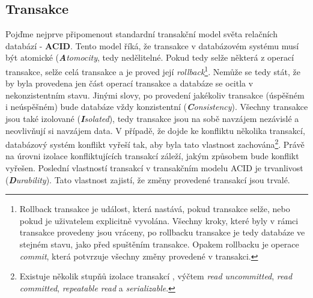 
\subsection{Transakce}
Pojďme nejprve připomenout standardní transakční model světa relačních databází - \textbf{ACID}. Tento model říká, že transakce v databázovém systému musí být atomické (\textit{\textbf{A}tomocity}, tedy nedělitelné. Pokud tedy selže některá z operací transakce, selže celá transakce a je proved její \textit{rollback}\footnote{Rollback transakce je událost, která nastává, pokud transakce selže, nebo pokud je uživatelem explicitně vyvolána. Všechny kroky, které byly v rámci transakce provedeny jsou vráceny, po rollbacku transakce je tedy databáze ve stejném stavu, jako před spuštěním transakce. Opakem rollbacku je operace \textit{commit}, která potvrzuje všechny změny provedené v transakci.}. Nemůže se tedy stát, že by byla provedena jen část operací transakce a databáze se ocitla v nekonzistentním stavu. Jinými slovy, po provedení jakékoliv transakce (úspěšném i neúspěšném) bude databáze vždy konzistentní (\textit{\textbf{C}onsistency}). Všechny transakce jsou také izolované (\textit{\textbf{I}solated}), tedy transakce jsou na sobě navzájem nezávislé a neovlivňují si navzájem data. V případě, že dojde ke konfliktu několika transakcí, databázový systém konflikt vyřeší tak, aby byla tato vlastnost zachována\footnote{Existuje několik stupňů izolace transakcí , výčtem \textit{read uncommitted}, \textit{read committed}, \textit{repeatable read} a \textit{serializable}.}. Právě na úrovni izolace konfliktujících transakcí záleží, jakým způsobem bude konflikt vyřešen. Poslední vlastností transakcí v transakčním modelu ACID je trvanlivost (\textit{\textbf{D}urability}). Tato vlastnost zajistí, že změny provedené transakcí jsou trvalé.

